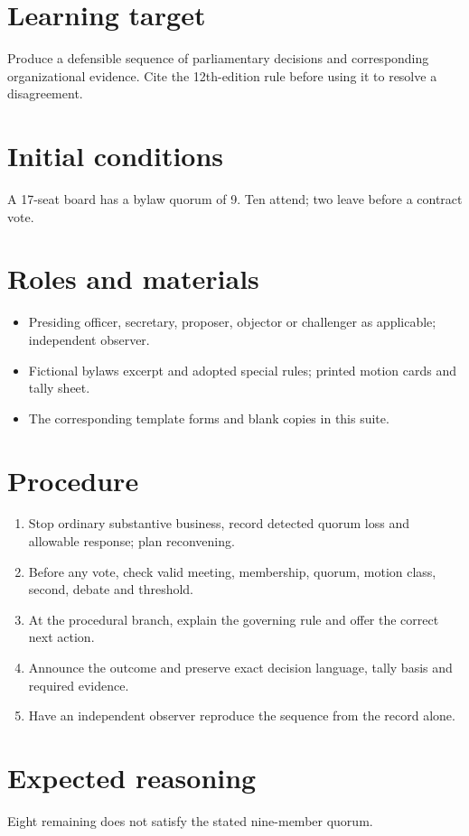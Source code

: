 \documentclass[11pt]{article}
\begin{document}
\SuiteOpen
\section{Learning target}
Produce a defensible sequence of parliamentary decisions and corresponding organizational evidence. Cite the 12th-edition rule before using it to resolve a disagreement.

\section{Initial conditions}
A 17-seat board has a bylaw quorum of 9. Ten attend; two leave before a contract vote.

\section{Roles and materials}
\begin{itemize}[leftmargin=*,itemsep=4pt]
\item Presiding officer, secretary, proposer, objector or challenger as applicable; independent observer.
\item Fictional bylaws excerpt and adopted special rules; printed motion cards and tally sheet.
\item The corresponding template forms and blank copies in this suite.
\end{itemize}

\section{Procedure}
\begin{enumerate}[leftmargin=*,itemsep=4pt]
\item Stop ordinary substantive business, record detected quorum loss and allowable response; plan reconvening.
\item Before any vote, check valid meeting, membership, quorum, motion class, second, debate and threshold.
\item At the procedural branch, explain the governing rule and offer the correct next action.
\item Announce the outcome and preserve exact decision language, tally basis and required evidence.
\item Have an independent observer reproduce the sequence from the record alone.
\end{enumerate}

\section{Expected reasoning}
Eight remaining does not satisfy the stated nine-member quorum.
\end{document}
